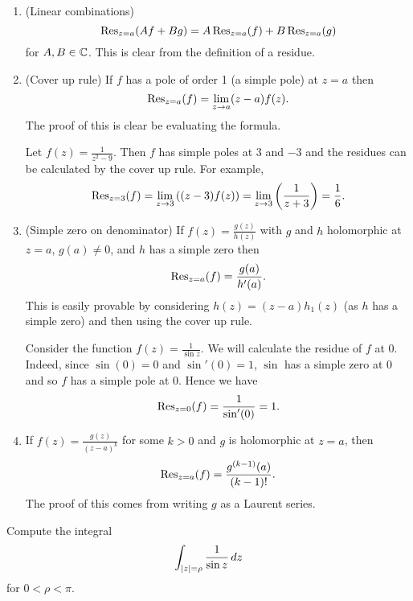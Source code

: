 \begin{enumerate}
    \item (Linear combinations)
        \[
            \operatorname{Res}_{z=a}(Af + Bg) = A\operatorname{Res}_{z=a}(f) + B\operatorname{Res}_{z=a}(g)
        \]
        for $A,B \in \mathbb{C}$.
        This is clear from the definition of a residue.

    \item (Cover up rule)
        If $f$ has a pole of order 1 (a simple pole) at $z=a$ then
        \[
            \operatorname{Res}_{z=a}(f) = \lim_{z\to a} (z-a)f(z).
        \]
        The proof of this is clear be evaluating the formula.
        \begin{example}
            Let $f(z) = \frac1{z^2-9}$.
            Then $f$ has simple poles at $3$ and $-3$ and the residues can be calculated
            by the cover up rule.
            For example,
            \[
                \operatorname{Res}_{z=3}(f) 
                = \lim_{z\to3} \left((z-3)f(z)\right)
                = \lim_{z\to3} \left(\frac{1}{z+3}\right)
                = \frac16.
            \]
        \end{example}

    \item (Simple zero on denominator)
        If $f(z) = \frac{g(z)}{h(z)}$ with $g$ and $h$ holomorphic at $z=a$,
        $g(a) \neq 0$, and $h$ has a simple zero then
        \[
            \operatorname{Res}_{z=a}(f) = \frac{g(a)}{h'(a)}.
        \]
        This is easily provable by considering $h(z) = (z-a)h_1(z)$ (as $h$ has a simple zero)
        and then using the cover up rule.
        \begin{example}
            Consider the function $f(z) = \frac1{\sin z}$.
            We will calculate the residue of $f$ at $0$.
            Indeed, since $\sin(0) = 0$ and $\sin'(0) = 1$, $\sin$ has a simple
            zero at $0$ and so $f$ has a simple pole at $0$.
            Hence we have
            \[
                \operatorname{Res}_{z=0} (f) = \frac{1}{\sin'(0)} = 1.
            \]
        \end{example}

    \item
        If $f(z) = \frac{g(z)}{(z-a)^k}$ for some $k > 0$ and $g$ is holomorphic at $z = a$,
        then
        \[
            \operatorname{Res}_{z=a} (f) = \frac{g^{(k-1)}(a)}{(k-1)!}.
        \]
        The proof of this comes from writing $g$ as a Laurent series.
\end{enumerate}

\begin{example}
    Compute the integral
    \[
        \int_{\left\lvert z\right\rvert = \rho} \frac{1}{\sin z} \,dz
    \]
    for $0 < \rho < \pi$.
\end{example}

